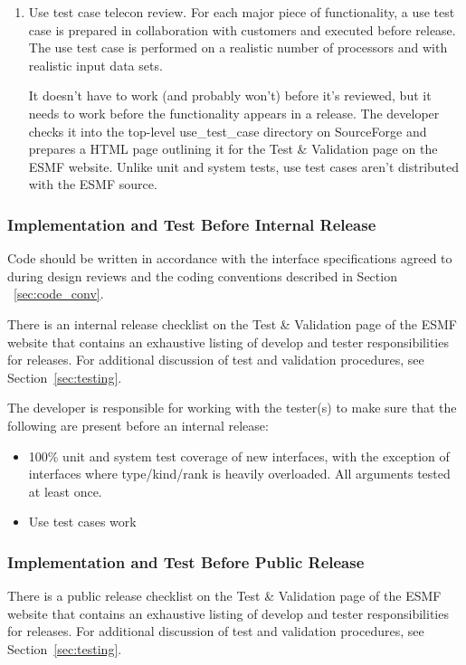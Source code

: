 \begin{enumerate}
\item Use test case telecon review. For each major piece of functionality, a use
test case is prepared in collaboration with customers and executed before
release. The use test case is performed on a realistic number of processors
and with realistic input data sets.

It doesn't have to work (and probably won't) before it's reviewed, but it
needs to work before the functionality appears in a release. The developer
checks it into the top-level use\_test\_case directory on SourceForge and
prepares a HTML page outlining it for the Test \& Validation page on the
ESMF website. Unlike unit and system tests, use test cases aren't
distributed with the ESMF source.
\end{enumerate}

\subsubsection{Implementation and Test Before Internal Release}

Code should be written in accordance with the interface specifications
agreed to during design reviews and the coding conventions described in 
Section ~\ref{sec:code_conv}.  

There is an internal release checklist on the Test \& Validation page of the
ESMF website that contains an exhaustive listing of develop and tester
responsibilities for releases.  For additional discussion
of test and validation procedures, see Section~\ref{sec:testing}.

The developer is responsible for working with the tester(s) to make sure
that the following are present before an internal release:
\begin{itemize}
\item 100\% unit and system test coverage of new interfaces, with the exception
of interfaces where type/kind/rank is heavily overloaded. All arguments tested
at least once.
\item Use test cases work
\end{itemize}

\subsubsection{Implementation and Test Before Public Release}

There is a public release checklist on the Test \& Validation page of the ESMF
website that contains an exhaustive listing of develop and tester
responsibilities for releases.  For additional discussion
of test and validation procedures, see Section~\ref{sec:testing}.

